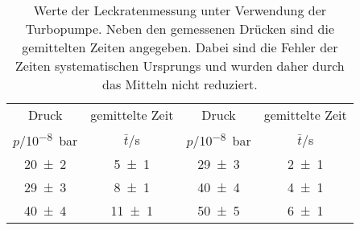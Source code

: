 \begin{table}[!h]
	\centering
	\begin{tabular}{cccc}
		\toprule
		Druck & gemittelte Zeit & Druck & gemittelte Zeit\\
		$p$/\si{10^{-8}bar} & $\bar{t}$/\si{s} & $p$/\si{10^{-8}bar} & $\bar{t}$/\si{s}\\
\midrule
		\num{20(2)} & \num{5(1)} & \num{29(3)} & \num{2(1)}\\
		\num{29(3)} & \num{8(1)} & \num{40(4)} & \num{4(1)}\\
		\num{40(4)} & \num{11(1)} & \num{50(5)} & \num{6(1)}\\
		\bottomrule
	\end{tabular}
	\caption{Werte der Leckratenmessung unter Verwendung der Turbopumpe.
                        Neben den gemessenen Drücken sind die gemittelten Zeiten angegeben. 
                        Dabei sind die Fehler der Zeiten systematischen Ursprungs und wurden 
                        daher durch das Mitteln nicht reduziert. \label{tab:Leckratenmessung_Turbo_0}}
\end{table}
